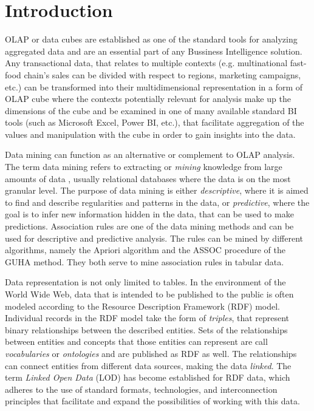 \chapter*{Introduction}

OLAP \cite{berson1997} or data cubes are established as one of the standard tools for analyzing aggregated data and are an essential part of any Bussiness Intelligence solution. Any transactional data, that relates to multiple contexts (e.g. multinational fast-food chain's sales can be divided with respect to regions, marketing campaigns, etc.) can be transformed into their multidimensional representation in a form of OLAP cube where the contexts potentially relevant for analysis make up the dimensions of the cube and be examined in one of many available standard BI tools (such as Microsoft Excel, Power BI, etc.), that facilitate aggregation of the values and manipulation with the cube in order to gain insights into the data.

Data mining can function as an alternative or complement \cite{Chudan2015} to OLAP analysis. The term data mining refers to extracting or \textit{mining} knowledge from large amounts of data \cite{hand2001}, usually relational databases where the data is on the most granular level. The purpose of data mining is either \textit{descriptive}, where it is aimed to find and describe regularities and patterns in the data, or \textit{predictive}, where the goal is to infer new information hidden in the data, that can be used to make predictions. Association rules are one of the data mining methods and can be used for descriptive and predictive analysis. The rules can be mined by different algorithms, namely the Apriori algorithm \cite{Agrawal1993} and the ASSOC procedure of the GUHA method.\cite{hajek1966} They both serve to mine association rules in tabular data.

Data representation is not only limited to tables. In the environment of the World Wide Web, data that is intended to be published to the public is often modeled according to the Resource Description Framework (RDF) model. Individual records in the RDF model take the form of \textit{triples}, that represent binary relationships between the described entities. Sets of the relationships between entities and concepts that those entities can represent are call \textit{vocabularies} or \textit{ontologies} and are published as RDF as well. The relationships can connect entities from different data sources, making the data \textit{linked}. The term \textit{Linked Open Data} (LOD) has become established for RDF data, which adheres to the use of standard formats, technologies, and interconnection principles that facilitate and expand the possibilities of working with this data. 

